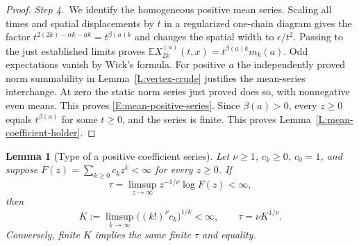\documentclass[12pt,oneside,openany]{book}
\makeatletter
\let\lean@pending\@empty
\newcommand{\LeanMarker}[1]{\gdef\lean@pending{#1}}
\numberwithin{equation}{section}
\newtheorem{lemma}[theorem]{Lemma}
\theoremstyle{nogostyle}
\theoremstyle{definition}
\newcommand{\E}{\mathbb{E}}
\makeatother
\begin{document}
\begin{proof}
  \medskip
  \noindent\textit{Step 4.~}We identify the homogeneous positive mean series.
  Scaling all times and spatial displacements by $t$ in a regularized one-chain
  diagram gives the factor $t^{2(2k)-\alpha k-ak} = t^{\beta(a)k}$ and changes
  the spatial width to $\epsilon/t^2$. Passing to the just established limits
  proves $\E X_{2k}^{(a)}(t,x) = t^{\beta(a)k}m_k(a)$. Odd expectations vanish
  by Wick's formula. For positive $a$ the independently proved norm summability
  in Lemma~\ref{L:vertex-crude} justifies the mean-series interchange. At zero
  the static norm series just proved does so, with nonnegative even means. This
  proves \eqref{E:mean-positive-series}. Since $\beta(a) > 0$, every $z \ge 0$
  equals $t^{\beta(a)}$ for some $t \ge 0$, and the series is finite. This
  proves Lemma~\ref{L:mean-coefficient-holder}.
\end{proof}

\LeanMarker{L:positive-series-type}
\begin{lemma}[Type of a positive coefficient series]\label{L:positive-series-type}
  Let $\nu \ge 1$, $c_k \ge 0$, $c_0 = 1$, and suppose $F(z) =
  \sum_{k\ge0}c_kz^k < \infty$ for every $z \ge 0$. If
  \[
    \tau=\limsup_{z\to\infty}z^{-1/\nu}\log F(z)<\infty,
  \]
  then
  \begin{equation}\label{E:positive-series-type}
    K:=\limsup_{k\to\infty}\big((k!)^\nu c_k\big)^{1/k}<\infty,
    \qquad \tau=\nu K^{1/\nu}.
  \end{equation}
  Conversely, finite $K$ implies the same finite $\tau$ and equality.
\end{lemma}
\end{document}
